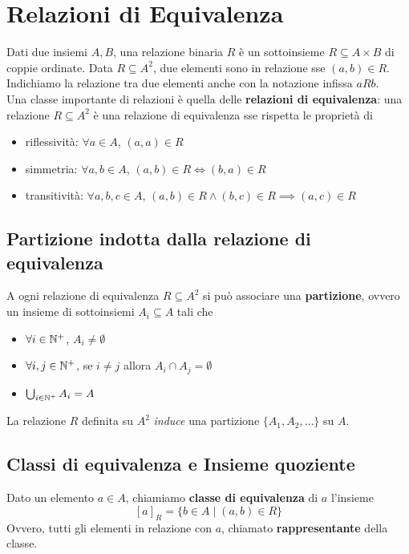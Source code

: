 \section{Relazioni di Equivalenza}
Dati due insiemi $A,B$, una relazione binaria $R$ è un sottoinsieme $R \subseteq A \times B$ di coppie ordinate. Data $R \subseteq A^2$, due elementi sono in relazione sse $(a,b) \in R$. Indichiamo la relazione tra due elementi anche con la notazione infissa $aRb$. \\

Una classe importante di relazioni è quella delle \textbf{relazioni di equivalenza}: una relazione $R \subseteq A^2$ è una relazione di equivalenza sse rispetta le proprietà di
\begin{itemize}
	\item riflessività: $\forall a \in A$, $(a,a) \in R$
	\item simmetria: $\forall a,b \in A$, $(a,b) \in R \Leftrightarrow (b,a) \in R$
	\item transitività: $\forall a,b,c \in A$, $(a,b) \in R \wedge (b,c) \in R \implies (a,c) \in R$
\end{itemize}

\subsection{Partizione indotta dalla relazione di equivalenza}
A ogni relazione di equivalenza $R \subseteq A^2$ si può associare una \textbf{partizione}, ovvero un insieme di sottoinsiemi $A_i \subseteq A$ tali che
\begin{itemize}
	\item $\forall i \in \mathbb{N}^+$, $A_i \neq \emptyset$
	\item $\forall i,j \in \mathbb{N}^+$, se $i \neq j$ allora $A_i \cap A_j = \emptyset$
	\item $\bigcup_{i \in \mathbb{N}^+} A_i = A$
\end{itemize}

La relazione $R$ definita su $A^2$ \textit{induce} una partizione $\{A_1, A_2, \dots\}$ su $A$.\\

\subsection{Classi di equivalenza e Insieme quoziente}
Dato un elemento $a \in A$, chiamiamo \textbf{classe di equivalenza} di $a$ l'insieme
$$ [a]_R = \{b \in A \mid (a,b) \in R \} $$
Ovvero, tutti gli elementi in relazione con $a$, chiamato \textbf{rappresentante} della classe. \\

